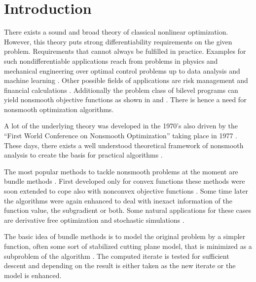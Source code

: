 \section{Introduction}

There exists a sound and broad theory of classical nonlinear optimization. However, this theory puts strong differentiability requirements on the given problem. Requirements that cannot always be fulfilled in practice.
Examples for such nondifferentiable applications reach from problems in physics and mechanical engineering \cite{Clarke1990} over optimal control problems up to data analysis \cite{Bagirov2014} and machine learning \cite{Smola2007}.
Other possible fields of applications are risk management and financial calculations \cite{Nesterov2016,Teo2010}. 
Additionally the problem class of bilevel programs can yield nonsmooth objective functions as shown in \cite{Outrata1998} and \cite{Moore2011}.
There is hence a need for nonsmooth optimization algorithms.

A lot of the underlying theory was developed in the 1970's also driven by the ``First World Conference on Nonsmooth Optimization'' taking place in 1977 \cite{Mifflin2012}.
These days, there exists a well understood theoretical framework of nonsmooth analysis to create the basis for practical algorithms \cite{Rockafellar2009}.

The most popular methods to tackle nonsmooth problems at the moment are bundle methods \cite{Hare2016}. First developed only for convex functions \cite{Lemarechal1978} these methods were soon extended to cope also with nonconvex objective functions \cite{Mifflin1982}.
Some time later the algorithms were again enhanced to deal with inexact information of the function value, the subgradient or both.
Some natural applications for these cases are derivative free optimization and stochastic simulations \cite{Hare2016}.



The basic idea of bundle methods is to model the original problem by a simpler function, often some sort of stabilized cutting plane model, that is minimized as a subproblem of the algorithm \cite[chapter XV]{Hiriart-Urruty1993}. 
The computed iterate is tested for sufficient descent and depending on the result is either taken as the new iterate or the model is enhanced.

